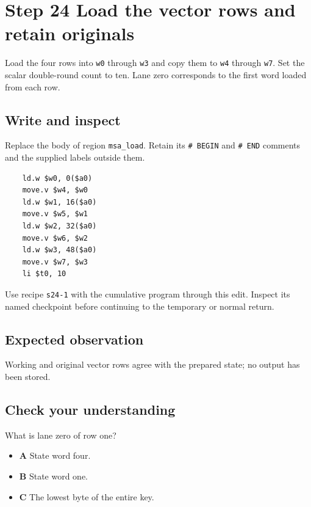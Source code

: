 \section{Step 24 Load the vector rows and retain originals}\label{chacha-s24}

Load the four rows into \texttt{w0} through \texttt{w3} and copy them to \texttt{w4} through \texttt{w7}. Set the scalar double-round count to ten. Lane zero corresponds to the first word loaded from each row.

\subsection{Write and inspect}
Replace the body of region \texttt{msa\_load}. Retain its \texttt{\# BEGIN} and \texttt{\# END} comments and the supplied labels outside them.

\begin{verbatim}
    ld.w $w0, 0($a0)
    move.v $w4, $w0
    ld.w $w1, 16($a0)
    move.v $w5, $w1
    ld.w $w2, 32($a0)
    move.v $w6, $w2
    ld.w $w3, 48($a0)
    move.v $w7, $w3
    li $t0, 10
\end{verbatim}

Use recipe \texttt{s24-1} with the cumulative program through this edit. Inspect its named checkpoint before continuing to the temporary or normal return.

\subsection{Expected observation}
Working and original vector rows agree with the prepared state; no output has been stored.

\subsection{Check your understanding}
What is lane zero of row one?

\begin{itemize}
  \item \textbf{A} State word four.
  \item \textbf{B} State word one.
  \item \textbf{C} The lowest byte of the entire key.
\end{itemize}
